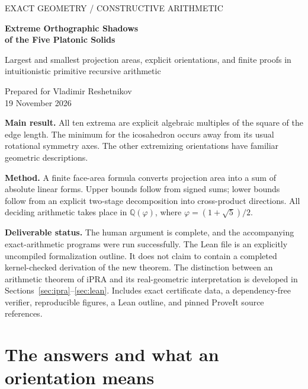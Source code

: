 \documentclass[11pt,a4paper]{article}
\newcommand{\ph}{\varphi}
\newcommand{\Q}{\mathbb Q}
\begin{document}
\hypersetup{pageanchor=false}
\begin{titlepage}
\vspace*{16mm}
{\color{teal}\large EXACT GEOMETRY \quad / \quad CONSTRUCTIVE ARITHMETIC\par}
\vspace{9mm}
{\color{ink}\Huge\bfseries Extreme Orthographic Shadows\\[4mm]of the Five Platonic Solids\par}
\vspace{9mm}
{\Large Largest and smallest projection areas, explicit orientations, and finite proofs in intuitionistic primitive recursive arithmetic\par}
\vspace{10mm}
{\large Prepared for Vladimir Reshetnikov\\19 November 2026\par}
\vspace{12mm}
\textbf{Main result.} All ten extrema are explicit algebraic multiples of the square of the edge length. The minimum for the icosahedron occurs away from its usual rotational symmetry axes. The other extremizing orientations have familiar geometric descriptions.

\textbf{Method.} A finite face-area formula converts projection area into a sum of absolute linear forms. Upper bounds follow from signed sums; lower bounds follow from an explicit two-stage decomposition into cross-product directions. All deciding arithmetic takes place in $\Q(\ph)$, where $\ph=(1+\sqrt5)/2$.

\textbf{Deliverable status.} The human argument is complete, and the accompanying exact-arithmetic programs were run successfully. The Lean file is an explicitly uncompiled formalization outline. It does not claim to contain a completed kernel-checked derivation of the new theorem. The distinction between an arithmetic theorem of iPRA and its real-geometric interpretation is developed in Sections~\ref{sec:ipra}--\ref{sec:lean}.
\vfill
{\small Includes exact certificate data, a dependency-free verifier, reproducible figures, a Lean outline, and pinned ProveIt source references.}
\end{titlepage}
\hypersetup{pageanchor=true}

\tableofcontents
\newpage

\section{The answers and what an orientation means}\label{sec:answers}
\end{document}
